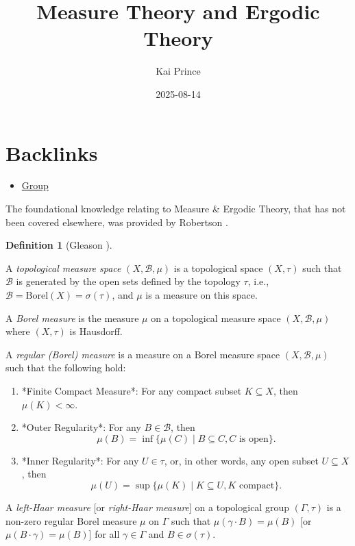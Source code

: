 \documentclass[
  british,
]{article}
\title{Measure Theory and Ergodic Theory}
\author{Kai Prince}
\date{2025-08-14}
\providecommand{\tightlist}{%
  \setlength{\itemsep}{0pt}\setlength{\parskip}{0pt}}
\renewcommand*\contentsname{Table of contents}
\newcommand\contentsname{Table of contents}
\theoremstyle{definition}
\newtheorem{definition}{Definition}[section]
\theoremstyle{remark}
\newcommand{\GroupElement}{{\gamma}}
\newcommand{\GroupOperation}[2]{{#1}\cdot{#2}}
\newcommand{\Topology}{{\tau}}
\newcommand{\SigmaAlgebraGenerator}[1][\Topology]{{\sigma({#1})}}
\newcommand{\Group}{{\Gamma}}
\newcommand{\Measure}{{\mu}}
\newcommand{\SigmaAlgebra}[1]{{\mathscr{#1}}}
\begin{document}
\maketitle

\renewcommand*\contentsname{Table of contents}
{
\hypersetup{linkcolor=}
\setcounter{tocdepth}{3}
\tableofcontents
}

\section*{Backlinks}\label{sec-Backlinks}

\begin{itemize}
\tightlist
\item
  \href{../../MathsNotes/0_Fundamental/group.html}{Group}
\end{itemize}

The foundational knowledge relating to Measure \& Ergodic Theory, that
has not been covered elsewhere, was provided by Robertson
.

\begin{definition}[Gleason
]\protect\hypertarget{def-TopoMeasureSpace}{}\label{def-TopoMeasureSpace}

A \emph{topological measure space} \((X,\SigmaAlgebra{B},\Measure)\) is
a topological space \((X,\Topology)\) such that \(\SigmaAlgebra{B}\) is
generated by the open sets defined by the topology \(\Topology\), i.e.,
\(\SigmaAlgebra{B}=\text{Borel}(X)=\SigmaAlgebraGenerator\), and
\(\Measure\) is a measure on this space.

A \emph{Borel measure} is the measure \(\Measure\) on a topological
measure space \((X,\SigmaAlgebra{B},\Measure)\) where \((X,\Topology)\)
is Hausdorff.

A \emph{regular (Borel) measure} is a measure on a Borel measure space
\((X,\SigmaAlgebra{B},\Measure)\) such that the following hold:

\begin{enumerate}
    \item *Finite Compact Measure*: For any compact subset $K\subseteq X$, then $\Measure(K)<\infty$.
    \item *Outer Regularity*: For any $B\in\SigmaAlgebra{B}$, then
    $$\Measure(B)=\inf\{\Measure(C)\mid B\subseteq C, C\text{ is open} \}. $$
    \item *Inner Regularity*: For any $U\in\Topology$, or, in other words, any open subset $U\subseteq X$, then
    $$\Measure(U)=\sup\{\Measure(K)\mid K\subseteq U, K\text{ compact} \}. $$
\end{enumerate}

A \emph{left-Haar measure} {[}or \emph{right-Haar measure}{]} on a
topological group \((\Group,\Topology)\) is a non-zero regular Borel
measure \(\Measure\) on \(\Group\) such that
\(\Measure(\GroupOperation{\GroupElement}{B})=\Measure(B)\) {[}or
\(\Measure(\GroupOperation{B}{\GroupElement})=\Measure(B)\){]} for all
\(\GroupElement\in\Group\) and \(B\in\sigma(\Topology)\).

\end{definition}
\end{document}

